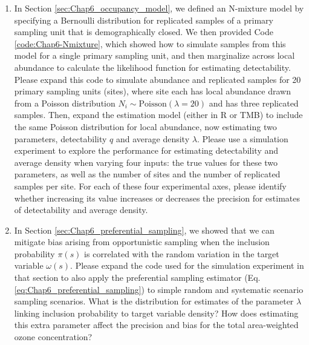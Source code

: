 \begin{enumerate}
    \item In Section \ref{sec:Chap6_occupancy_model}, we defined an N-mixture model by specifying a Bernoulli distribution for replicated samples of a primary sampling unit that is demographically closed.  We then provided Code \ref{code:Chap6-Nmixture}, which showed how to simulate samples from this model for a single primary sampling unit, and then marginalize across local abundance to calculate the likelihood function for estimating detectability.  Please expand this code to simulate abundance and replicated samples for 20 primary sampling units (sites), where site each has local abundance drawn from a Poisson distribution \(N_i \sim \mathrm{Poisson}(\lambda=20)\) and has three replicated samples.  Then, expand the estimation model (either in R or TMB) to include the same Poisson distribution for local abundance, now estimating two parameters, detectability \(q\) and average density \(\lambda\).  Please use a simulation experiment to explore the performance for estimating detectability and average density when varying four inputs: the true values for these two parameters, as well as the number of sites and the number of replicated samples per site.  For each of these four experimental axes, please identify whether increasing its value increases or decreases the precision for estimates of detectability and average density.

    \item In Section \ref{sec:Chap6_preferential_sampling}, we showed that we can mitigate bias arising from opportunistic sampling when the inclusion probability \(\pi(s)\) is correlated with the random variation in the target variable \(\omega(s)\).  Please expand the code used for the simulation experiment in that section to also apply the preferential sampling estimator (Eq. \ref{eq:Chap6_preferential_sampling}) to simple random and systematic scenario sampling scenarios.  What is the distribution for estimates of the parameter \(\lambda\) linking inclusion probability to target variable density?  How does estimating this extra parameter affect the precision and bias for the total area-weighted ozone concentration?

\end{enumerate}


